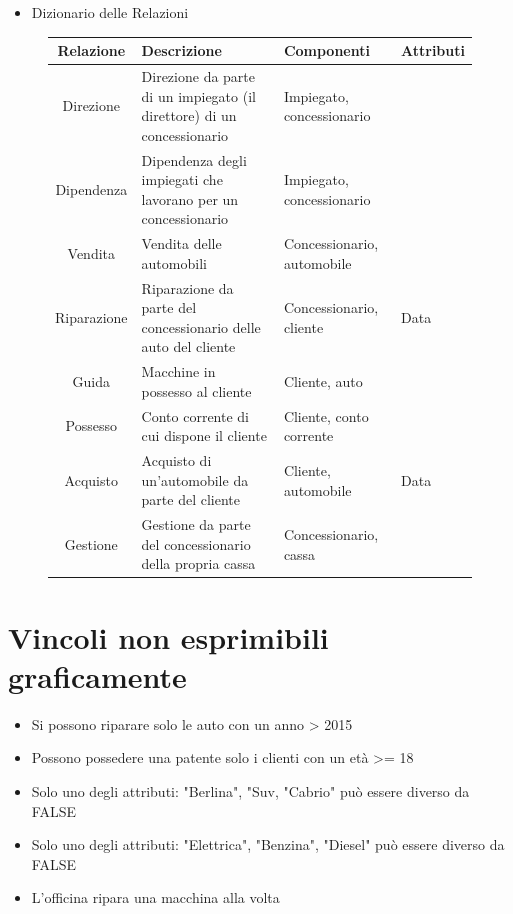 \documentclass[12pt,a4paper]{article}
\begin{document}
\pagebreak
\begin{itemize}
	\item Dizionario delle Relazioni
\end{itemize}
\begin{figure}[H]
	\centering
\begin{tabular}{|c|p{40mm}|p{40mm}|p{30mm}|}
	\hline
	\textbf{Relazione} & \textbf{Descrizione}  & \textbf{Componenti} & \textbf{Attributi} \\
	\hline
	Direzione & Direzione da parte di un impiegato (il direttore) di un concessionario & Impiegato, concessionario &  \\
	\hline
	Dipendenza & Dipendenza degli impiegati che lavorano per un concessionario & Impiegato, concessionario &  \\
	\hline
	Vendita & Vendita delle automobili & Concessionario, automobile  & \\
	\hline
	Riparazione & Riparazione da parte del concessionario delle auto del cliente & Concessionario, cliente & Data  \\
	\hline
	Guida  &  Macchine in possesso al cliente &  Cliente, auto &  \\
	\hline
	Possesso & Conto corrente di cui dispone il cliente & Cliente, conto corrente &  \\
	\hline
	Acquisto & Acquisto di un’automobile da parte del cliente & Cliente, automobile & Data \\
	\hline
	Gestione & Gestione da parte del concessionario della propria cassa  & Concessionario, cassa &  \\
	\hline
\end{tabular}
\end{figure}

\vspace{5mm}
\section{Vincoli non esprimibili graficamente}

\begin{itemize}
	\item Si possono riparare solo le auto con un anno > 2015
	\item Possono possedere una patente solo i clienti con un età >= 18
	\item Solo uno degli attributi: "Berlina", "Suv, "Cabrio" può essere diverso da FALSE
	\item Solo uno degli attributi: "Elettrica", "Benzina", "Diesel" può essere diverso da FALSE
	\item L'officina ripara una macchina alla volta 
	
\end{itemize}
\end{document}
